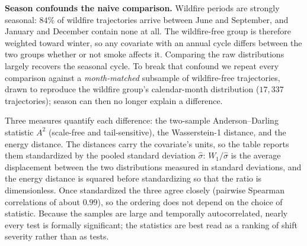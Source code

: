 \documentclass[11pt]{article}
\begin{document}
\textbf{Season confounds the naive comparison.} Wildfire periods are strongly seasonal:
$84\%$ of wildfire trajectories arrive between June and September, and January and December
contain none at all. The wildfire-free group is therefore weighted toward winter, so any
covariate with an annual cycle differs between the two groups whether or not smoke affects
it. Comparing the raw distributions largely recovers the seasonal cycle. To break that
confound we repeat every comparison against a \emph{month-matched} subsample of
wildfire-free trajectories, drawn to reproduce the wildfire group's calendar-month
distribution ($17{,}337$ trajectories); season can then no longer explain a difference.

Three measures quantify each difference: the two-sample Anderson--Darling statistic $A^2$
(scale-free and tail-sensitive), the Wasserstein-1 distance, and the energy distance. The
distances carry the covariate's units, so the table reports them standardized by the pooled
standard deviation $\hat\sigma$: $W_1/\hat\sigma$ is the average displacement between the
two distributions measured in standard deviations, and the energy distance is squared
before standardizing so that the ratio is dimensionless. Once standardized the three agree
closely (pairwise Spearman correlations of about $0.99$), so the ordering does not depend
on the choice of statistic. Because the samples are large and temporally autocorrelated,
nearly every test is formally significant; the statistics are best read as a ranking of
shift severity rather than as tests.
\end{document}
